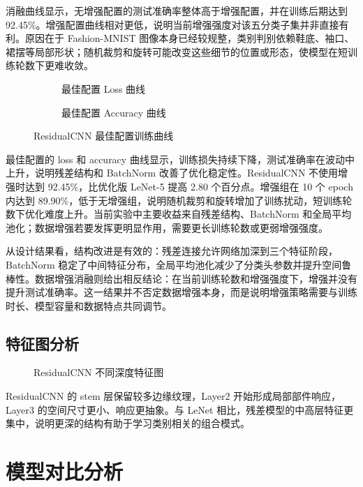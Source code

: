 \documentclass[UTF8]{ctexart}
\begin{document}
消融曲线显示，无增强配置的测试准确率整体高于增强配置，并在训练后期达到 92.45\%。增强配置曲线相对更低，说明当前增强强度对该五分类子集并非直接有利。原因在于 Fashion-MNIST 图像本身已经较规整，类别判别依赖鞋底、袖口、裙摆等局部形状；随机裁剪和旋转可能改变这些细节的位置或形态，使模型在短训练轮数下更难收敛。

\begin{figure}[H]
\centering
\begin{subfigure}{0.48\textwidth}
  \centering
  \caption{最佳配置 Loss 曲线}
\end{subfigure}
\begin{subfigure}{0.48\textwidth}
  \centering
  \caption{最佳配置 Accuracy 曲线}
\end{subfigure}
\caption{ResidualCNN 最佳配置训练曲线}
\end{figure}

最佳配置的 loss 和 accuracy 曲线显示，训练损失持续下降，测试准确率在波动中上升，说明残差结构和 BatchNorm 改善了优化稳定性。ResidualCNN 不使用增强时达到 92.45\%，比优化版 LeNet-5 提高 2.80 个百分点。增强组在 10 个 epoch 内达到 89.90\%，低于无增强组，说明随机裁剪和旋转增加了训练扰动，短训练轮数下优化难度上升。当前实验中主要收益来自残差结构、BatchNorm 和全局平均池化；数据增强若要发挥更明显作用，需要更长训练轮数或更弱增强强度。

从设计结果看，结构改进是有效的：残差连接允许网络加深到三个特征阶段，BatchNorm 稳定了中间特征分布，全局平均池化减少了分类头参数并提升空间鲁棒性。数据增强消融则给出相反结论：在当前训练轮数和增强强度下，增强并没有提升测试准确率。这一结果并不否定数据增强本身，而是说明增强策略需要与训练时长、模型容量和数据特点共同调节。

\subsection{特征图分析}

\begin{figure}[H]
\centering
{}
\caption{ResidualCNN 不同深度特征图}
\end{figure}

ResidualCNN 的 stem 层保留较多边缘纹理，Layer2 开始形成局部部件响应，Layer3 的空间尺寸更小、响应更抽象。与 LeNet 相比，残差模型的中高层特征更集中，说明更深的结构有助于学习类别相关的组合模式。

\section{模型对比分析}
\end{document}

